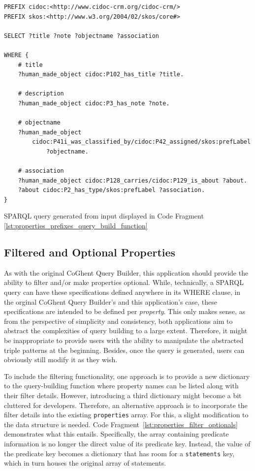 \begin{listing}[htbp]
    \begin{verbatim}
PREFIX cidoc:<http://www.cidoc-crm.org/cidoc-crm/>
PREFIX skos:<http://www.w3.org/2004/02/skos/core#>

SELECT ?title ?note ?objectname ?association

WHERE {
    # title
    ?human_made_object cidoc:P102_has_title ?title.
    
    # description
    ?human_made_object cidoc:P3_has_note ?note.
    
    # objectname
    ?human_made_object
        cidoc:P41i_was_classified_by/cidoc:P42_assigned/skos:prefLabel
            ?objectname.
            
    # association
    ?human_made_object cidoc:P128_carries/cidoc:P129_is_about ?about.
    ?about cidoc:P2_has_type/skos:prefLabel ?association.
}
    \end{verbatim}
    \caption{SPARQL query generated from input displayed in Code Fragment \ref{lst:properties_prefixes_query_build_function}}
    \label{lst:query_generated_edge_cases}
\end{listing}

\subsection{Filtered and Optional Properties}
\label{subsec:filter_optional_properties}

As with the original CoGhent Query Builder, this application should provide the ability to filter and/or make properties optional. While, technically, a SPARQL query can have these specifications defined anywhere in its WHERE clause, in the orginal CoGhent Query Builder's and this application's case, these specifications are intended to be defined per \textit{property}. This only makes sense, as from the perspective of simplicity and consistency, both applications aim to abstract the complexities of query building to a large extent. Therefore, it might be inappropriate to provide users with the ability to manipulate the abstracted triple patterns at the beginning. Besides, once the query is generated, users can obviously still modify it as they wish.

To include the filtering functionality, one approach is to provide a new dictionary to the query-building function where property names can be listed along with their filter details. However, introducing a third dictionary might become a bit cluttered for developers. Therefore, an alternative approach is to incorporate the filter details into the existing \texttt{properties} array. For this, a slight modification to the data structure is needed. Code Fragment~\ref{lst:properties_filter_optionals} demonstrates what this entails. Specifically, the array containing predicate information is no longer the direct value of its predicate key. Instead, the value of the predicate key becomes a dictionary that has room for a \texttt{statements} key, which in turn houses the original array of statements.

